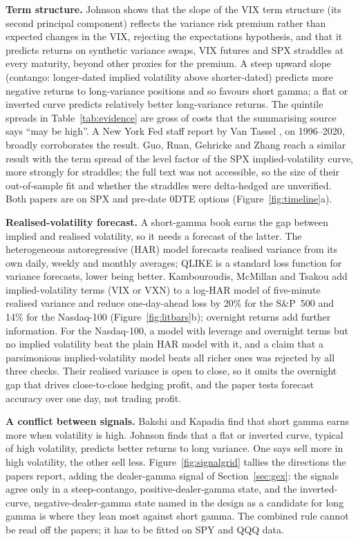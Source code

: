 \documentclass[10pt, a4paper, twocolumn]{article}
\begin{document}
\textbf{Term structure.} Johnson \cite{johnson2017} shows that the slope of the VIX term structure (its second principal component) reflects the variance risk premium rather than expected changes in the VIX, rejecting the expectations hypothesis, and that it predicts returns on synthetic variance swaps, VIX futures and SPX straddles at every maturity, beyond other proxies for the premium. A steep upward slope (contango: longer-dated implied volatility above shorter-dated) predicts more negative returns to long-variance positions and so favours short gamma; a flat or inverted curve predicts relatively better long-variance returns. The quintile spreads in Table~\ref{tab:evidence} are gross of costs that the summarising source \cite{cxo} says ``may be high''. A New York Fed staff report by Van Tassel \cite{vantassel}, on 1996--2020, broadly corroborates the result. Guo, Ruan, Gehricke and Zhang \cite{guo2023} reach a similar result with the term spread of the level factor of the SPX implied-volatility curve, more strongly for straddles; the full text was not accessible, so the size of their out-of-sample fit and whether the straddles were delta-hedged are unverified. Both papers are on SPX and pre-date 0DTE options (Figure~\ref{fig:timeline}a).

\textbf{Realised-volatility forecast.} A short-gamma book earns the gap between implied and realised volatility, so it needs a forecast of the latter. The heterogeneous autoregressive (HAR) model forecasts realised variance from its own daily, weekly and monthly averages; QLIKE is a standard loss function for variance forecasts, lower being better. Kambouroudis, McMillan and Tsakou \cite{kambouroudis2021} add implied-volatility terms (VIX or VXN) to a log-HAR model of five-minute realised variance and reduce one-day-ahead loss by 20\% for the S\&P~500 and 14\% for the Nasdaq-100 (Figure~\ref{fig:litbars}b); overnight returns add further information. For the Nasdaq-100, a model with leverage and overnight terms but no implied volatility beat the plain HAR model with it, and a claim that a parsimonious implied-volatility model beats all richer ones was rejected by all three checks. Their realised variance is open to close, so it omits the overnight gap that drives close-to-close hedging profit, and the paper tests forecast accuracy over one day, not trading profit.

\textbf{A conflict between signals.} Bakshi and Kapadia find that short gamma earns more when volatility is high. Johnson finds that a flat or inverted curve, typical of high volatility, predicts better returns to long variance. One says sell more in high volatility, the other sell less. Figure~\ref{fig:signalgrid} tallies the directions the papers report, adding the dealer-gamma signal of Section~\ref{sec:gex}: the signals agree only in a steep-contango, positive-dealer-gamma state, and the inverted-curve, negative-dealer-gamma state named in the design as a candidate for long gamma is where they lean most against short gamma. The combined rule cannot be read off the papers; it has to be fitted on SPY and QQQ data.
\end{document}

